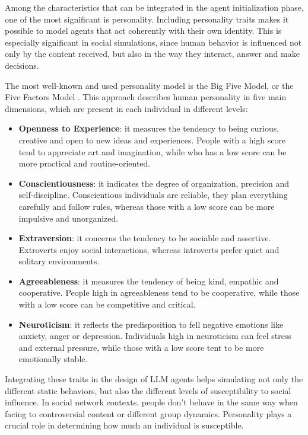 Among the characteristics that can be integrated in the agent initialization phase, one of the most significant is personality.
Including personality traits makes it possible to model agents that act coherently with their own identity.
This is especially significant in social simulations, since human behavior is influenced not only by the content received, but also in the way they interact, answer and make decisions.

\medskip
The most well-known and used personality model is the Big Five Model, or the Five Factors Model \cite{barrick1991bigfive, McCrae1992}. This approach describes human personality in five main dimensions, which are present in each individual in different levels:

\begin{itemize}
    \item \textbf{Openness to Experience}: it measures the tendency to being curious, creative and open to new ideas and experiences. People with a high score tend to appreciate art and imagination, while who has a low score can be more practical and routine-oriented.
    
    \item \textbf{Conscientiousness}: it indicates the degree of organization, precision and self-discipline. Conscientious individuals are reliable, they plan everything carefully and follow rules, whereas those with a low score can be more impulsive and unorganized.
    
    \item \textbf{Extraversion}: it concerns the tendency to be sociable and assertive. Extroverts enjoy social interactions, whereas introverts prefer quiet and solitary environments. 
    
    \item \textbf{Agreeableness}: it measures the tendency of being kind, empathic and cooperative. People high in agreeableness tend to be cooperative, while those with a low score can be competitive and critical.
    
    \item \textbf{Neuroticism}: it reflects the predisposition to fell negative emotions like anxiety, anger or depression. Individuals high in neuroticism can feel stress and external pressure, while those with a low score tent to be more emotionally stable. 
\end{itemize}


\medskip
Integrating these traits in the design of LLM agents helps simulating not only the different static behaviors, but also the different levels of susceptibility to social influence.
In social network contexts, people don't behave in the same way when facing to controversial content or different group dynamics.
Personality plays a crucial role in determining how much an individual is susceptible.

